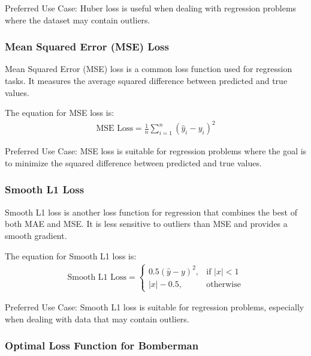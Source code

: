 Preferred Use Case: Huber loss is useful when dealing with regression problems where the dataset may contain outliers.

\subsubsection{Mean Squared Error (MSE) Loss}

Mean Squared Error (MSE) loss is a common loss function used for regression tasks. It measures the average squared difference between predicted and true values.

The equation for MSE loss is:
\begin{align}
	\text{MSE Loss} = \frac{1}{n} \sum_{i=1}^{n} (\hat{y}_i - y_i)^2    
\end{align}

Preferred Use Case: MSE loss is suitable for regression problems where the goal is to minimize the squared difference between predicted and true values.

\subsubsection{Smooth L1 Loss}

Smooth L1 loss is another loss function for regression that combines the best of both MAE and MSE. It is less sensitive to outliers than MSE and provides a smooth gradient.

The equation for Smooth L1 loss is:
\begin{align}
	\text{Smooth L1 Loss} = \begin{cases}
		0.5(\hat{y} - y)^2, & \text{if } |x| < 1 \\
		|x| - 0.5, & \text{otherwise}
	\end{cases}    
\end{align}

Preferred Use Case: Smooth L1 loss is suitable for regression problems, especially when dealing with data that may contain outliers.

\subsubsection{Optimal Loss Function for Bomberman}

